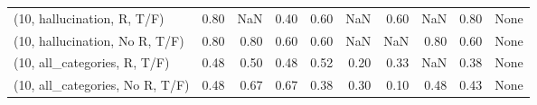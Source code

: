 \begin{table*}[h!]
\begin{adjustbox}{width=2\columnwidth,center}
\begin{tabular}{lrrr|rrr|rrr}
(10, hallucination, R, T/F)           &                      0.80 &                   NaN &                      0.40 &                          0.60 &                       NaN &                          0.60 &                                    NaN &                               0.80 &                                  None \\
(10, hallucination, No R, T/F)        &                      0.80 &                  0.80 &                      0.60 &                          0.60 &                       NaN &                           NaN &                                   0.80 &                               0.60 &                                  None \\
(10, all\_categories, R, T/F)          &                      0.48 &                  0.50 &                      0.48 &                          0.52 &                      0.20 &                          0.33 &                                    NaN &                               0.38 &                                  None \\
(10, all\_categories, No R, T/F)       &                      0.48 &                  0.67 &                      0.67 &                          0.38 &                      0.30 &                          0.10 &                                   0.48 &                               0.43 &                                  None \\




\end{tabular}
\end{adjustbox}
\end{table*}
